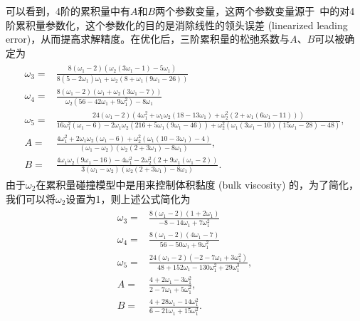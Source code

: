 可以看到，4阶的累积量中有$A$和$B$两个参数变量，这两个参数变量源于~\cite{Geier-2017}中的对4阶累积量参数化，这个参数化的目的是消除线性的领头误差 (linearized leading error)，从而提高求解精度。在优化后，三阶累积量的松弛系数与$A$、$B$可以被确定为
\begin{align}
    \begin{split}
\omega_{3} =& \frac{8\left(\omega_{1}-2\right)\left(\omega_{2}\left(3 \omega_{1}-1\right)-5 \omega_{1}\right)}{8\left(5-2 \omega_{1}\right) \omega_{1}+\omega_{2}\left(8+\omega_{1}\left(9 \omega_{1}-26\right)\right)} \\
\omega_{4} =& \frac{8\left(\omega_{1}-2\right)\left(\omega_{1}+\omega_{2}\left(3 \omega_{1}-7\right)\right)}{\omega_{2}\left(56-42 \omega_{1}+9 \omega_{1}^{2}\right)-8 \omega_{1}} \\
\omega_{5} =& \frac{24\left(\omega_{1}-2\right)\left(4 \omega_{1}^{2}+\omega_{1} \omega_{2}\left(18-13 \omega_{1}\right)+\omega_{2}^{2}\left(2+\omega_{1}\left(6 \omega_{1}-11\right)\right)\right)}{16 \omega_{1}^{2}\left(\omega_{1}-6\right)-2 \omega_{1} \omega_{2}\left(216+5 \omega_{1}\left(9 \omega_{1}-46\right)\right)+\omega_{2}^{2}\left(\omega_{1}\left(3 \omega_{1}-10\right)\left(15 \omega_{1}-28\right)-48\right)}, \\
A =& \frac{4 \omega_{1}^{2}+2 \omega_{1} \omega_{2}\left(\omega_{1}-6\right)+\omega_{2}^{2}\left(\omega_{1}\left(10-3 \omega_{1}\right)-4\right)}{\left(\omega_{1}-\omega_{2}\right)\left(\omega_{2}\left(2+3 \omega_{1}\right)-8 \omega_{1}\right)}, \\
B = & \frac{4 \omega_{1} \omega_{2}\left(9 \omega_{1}-16\right)-4 \omega_{1}^{2}-2 \omega_{2}^{2}\left(2+9 \omega_{1}\left(\omega_{1}-2\right)\right)}{3\left(\omega_{1}-\omega_{2}\right)\left(\omega_{2}\left(2+3 \omega_{1}\right)-8 \omega_{1}\right)} .
\end{split}
\end{align}
由于$\omega_{2}$在累积量碰撞模型中是用来控制体积黏度 (bulk viscosity) 的，为了简化，我们可以将$\omega_{2}$设置为1，则上述公式简化为
\begin{align}
    \begin{split}
    \omega_{3} =& \frac{8\left(\omega_{1}-2\right)\left(1+2 \omega_{1}\right)}{-8-14\omega_{1}+7\omega_{1}^2} \\
    \omega_{4} =& \frac{8\left(\omega_{1}-2\right)\left(4 \omega_{1}-7\right)}{56-50\omega_{1}+9\omega_{1}^2} \\
    \omega_{5} =& \frac{24\left(\omega_{1}-2\right)\left(-2-7\omega_{1}+3\omega_{1}^2\right)}{48+152\omega_{1}-130\omega_{1}^2+29\omega_{1}^3}, \\
    A =& \frac{4+2\omega_{1}-3\omega_{1}^2}{2-7\omega_{1}+5\omega_{1}^2}, \\
    B =& \frac{4+28\omega_{1}-14\omega_{1}^2}{6-21\omega_{1}+15\omega_{1}^2} .
\end{split}
\end{align}


